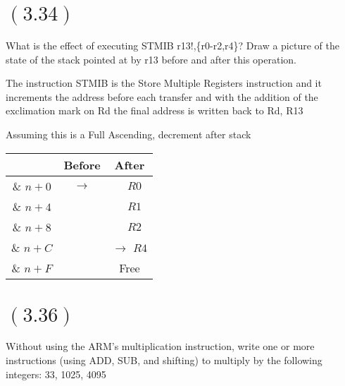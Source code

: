 \documentclass[letterpaper,12pt,titlepage]{article}
\begin{document}
\section*{$(3.34)$} What is the effect of executing STMIB r13!,\{r0-r2,r4\}? Draw a picture of the state of the stack pointed at by r13 before and after this operation.
\begin{mdframed}[style=MyFrame]

The instruction STMIB is the Store Multiple Registers instruction and it increments the address before each transfer and with the addition of the exclimation mark on Rd the final address is written back to Rd, R13 \\

\begin{center}
Assuming this is a Full Ascending, decrement after stack
\begin{tabular}{| c | c | c |}
\hline
& Before & After\\ \hline \hline
\& $n+0$ &  $\rightarrow$ &$~~~~R0$\\ \hline
\& $n+4$ &   &$~~~~R1$\\ \hline
\& $n+8$ &   &$~~~~R2$\\ \hline
\& $n+C$ &   &$\rightarrow$ $R4$\\ \hline
\& $n+F$ &   &Free\\ \hline

\end{tabular}
\end{center}
\end{mdframed}
\newpage
\section*{$(3.36)$} Without using the ARM's multiplication instruction, write one or more instructions (using ADD, SUB, and shifting) to multiply by the following integers: 33, 1025, 4095
\end{document}
